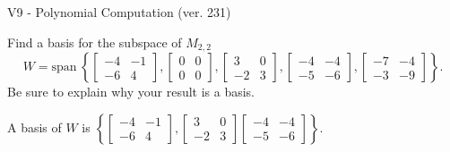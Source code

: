 \begin{exercise}
  \begin{exerciseTitle}V9 - Polynomial Computation (ver. 231)\end{exerciseTitle}
  \begin{exerciseStatement}
    Find a basis for the subspace of \(M_{2,2}\) 
\[W=\mathrm{span}\ \left\{\left[\begin{array}{cc}
-4 & -1 \\
-6 & 4
\end{array}\right] , \left[\begin{array}{cc}
0 & 0 \\
0 & 0
\end{array}\right] , \left[\begin{array}{cc}
3 & 0 \\
-2 & 3
\end{array}\right] , \left[\begin{array}{cc}
-4 & -4 \\
-5 & -6
\end{array}\right] , \left[\begin{array}{cc}
-7 & -4 \\
-3 & -9
\end{array}\right]\right\}.\]
 Be sure to explain why your result is a basis.


  \end{exerciseStatement}
  \begin{exerciseAnswer}
   A basis of \(W\) is  \(\left\{\left[\begin{array}{cc}
-4 & -1 \\
-6 & 4
\end{array}\right] , \left[\begin{array}{cc}
3 & 0 \\
-2 & 3
\end{array}\right] \left[\begin{array}{cc}
-4 & -4 \\
-5 & -6
\end{array}\right]\right\}\).
  


  \end{exerciseAnswer}
\end{exercise}